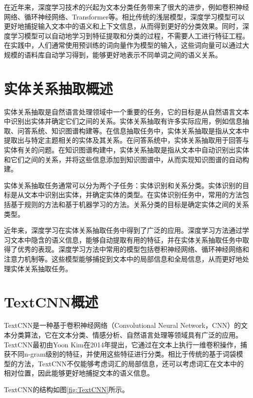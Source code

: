 \documentclass{report}
\begin{document}
	在近年来，深度学习技术的兴起为文本分类任务带来了很大的进步，例如卷积神经网络、循环神经网络、Transformer等。相比传统的浅层模型，深度学习模型可以更好地捕捉输入文本中的语义和上下文信息，从而得到更好的分类效果。同时，深度学习模型可以自动地学习到特征提取和分类的过程，不需要人工进行特征工程。在实践中，人们通常使用预训练的词向量作为模型的输入，这些词向量可以通过大规模的语料库自动学习得到，能够更好地表示不同单词之间的语义关系。
	
	\section{实体关系抽取概述}
	
	实体关系抽取是自然语言处理领域中一个重要的任务，它的目标是从自然语言文本中识别出实体并确定它们之间的关系。实体关系抽取有许多实际应用，例如信息抽取、问答系统、知识图谱构建等。在信息抽取任务中，实体关系抽取是指从文本中提取出与特定主题相关的实体及其关系。在问答系统中，实体关系抽取用于回答与实体有关的问题。在知识图谱构建中，实体关系抽取是指从文本中自动识别出实体和它们之间的关系，并将这些信息添加到知识图谱中，从而实现知识图谱的自动构建。
	
	实体关系抽取任务通常可以分为两个子任务：实体识别和关系分类。实体识别的目标是从文本中识别出实体，并确定实体的类型。在实体识别任务中，常用的方法包括基于规则的方法和基于机器学习的方法。关系分类的目标是确定实体之间的关系类型。
	
	近年来，深度学习在实体关系抽取任务中得到了广泛的应用。深度学习方法通过学习文本中隐含的语义信息，能够自动提取有用的特征，并在实体关系抽取任务中取得了优秀的表现。深度学习方法中常用的模型包括卷积神经网络、循环神经网络和注意力机制等。这些模型能够捕捉到文本中的局部信息和全局信息，从而更好地处理实体关系抽取任务。
	
	\section{TextCNN概述}
	TextCNN是一种基于卷积神经网络（Convolutional Neural Network，CNN）的文本分类算法，它在文本分类、情感分析、自然语言处理等领域具有广泛的应用。TextCNN最初由Yoon Kim在2014年提出，它通过在文本上执行一维卷积操作，捕获不同n-gram级别的特征，并使用这些特征进行分类。相比于传统的基于词袋模型的方法，TextCNN不仅能够考虑词汇的局部信息，还可以考虑词汇在文本中的相对位置，因此能够更好地捕捉文本的语义信息。
	
	TextCNN的结构如图\ref{fig:TextCNN}所示。
	
\end{document}
